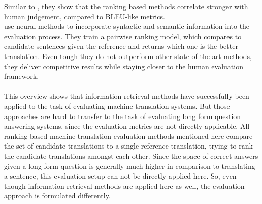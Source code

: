 Similar to \cite{duh:2008:Ranking}, they show that the ranking based methods correlate stronger with human judgement, compared to BLEU-like metrics.
\\
\cite{guzman:2019:Pairwise} use neural methods to incorporate syntactic and semantic information into the evaluation process.
They train a pairwise ranking model, which compares to candidate sentences given the reference and returns which one is the better translation.
Even tough they do not outperform other state-of-the-art methods, they deliver competitive results while staying closer to the human evaluation framework.
\\
\\
This overview shows that information retrieval methods have successfully been applied to the task of evaluating machine translation systems.
But those approaches are hard to transfer to the task of evaluating long form question answering systems, since the evaluation metrics are not directly applicable.
All ranking based machine translation evaluation methods mentioned here compare the set of candidate translations to a single reference translation, trying to rank the candidate translations amongst each other.
Since the space of correct answers given a long form question is generally much higher in comparison to translating a sentence, this evaluation setup can not be directly applied here.
So, even though information retrieval methods are applied here as well, the evaluation approach is formulated differently.

